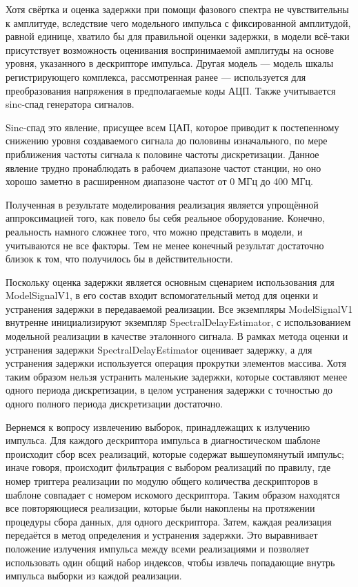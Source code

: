 \documentclass{report}
\begin{document}
Хотя свёртка и оценка задержки при помощи фазового спектра не чувствительны к амплитуде, вследствие чего  модельного импульса с фиксированной амплитудой, равной единице, хватило бы для правильной оценки задержки, в модели всё-таки присутствует возможность оценивания воспринимаемой амплитуды на основе уровня, указанного в дескрипторе импульса. Другая модель --- модель шкалы регистрирующего комплекса, рассмотренная ранее --- используется для преобразования напряжения в предполагаемые коды АЦП. Также учитывается sinc-спад генератора сигналов.

Sinc-спад это явление, присущее всем ЦАП, которое приводит к постепенному снижению уровня создаваемого сигнала до половины изначального, по мере приближения частоты сигнала к половине частоты дискретизации. Данное явление трудно пронаблюдать в рабочем диапазоне частот станции, но оно хорошо заметно в расширенном диапазоне частот от 0 МГц до 400 МГц.

Полученная в результате моделирования реализация является упрощённой аппроксимацией того, как повело бы себя реальное оборудование. Конечно, реальность намного сложнее того, что можно представить в модели, и учитываются не все факторы. Тем не менее конечный результат достаточно близок к том, что получилось бы в действительности.

Поскольку оценка задержки является основным сценарием использования для ModelSignalV1, в его состав входит вспомогательный метод для оценки и устранения задержки в передаваемой реализации. Все экземпляры ModelSignalV1 внутренне инициализируют экземпляр SpectralDelayEstimator, с использованием модельной реализации в качестве эталонного сигнала. В рамках метода оценки и устранения задержки SpectralDelayEstimator оценивает задержку, а для устранения задержки используется операция прокрутки элементов массива. Хотя таким образом нельзя устранить маленькие задержки, которые составляют менее одного периода дискретизации, в целом устранения задержки с точностью до одного полного периода дискретизации достаточно.

Вернемся к вопросу извлечению выборок, принадлежащих к излучению импульса. Для каждого дескриптора импульса в диагностическом шаблоне происходит сбор всех реализаций, которые содержат вышеупомянутый импульс; иначе говоря, происходит фильтрация с выбором реализаций по правилу, где номер триггера реализации по модулю общего количества дескрипторов в шаблоне совпадает с номером искомого дескриптора. Таким образом находятся все повторяющиеся реализации, которые были накоплены на протяжении процедуры сбора данных, для одного дескриптора. Затем, каждая реализация передаётся в метод определения и устранения задержки. Это выравнивает положение излучения импульса между всеми реализациями и позволяет использовать один общий набор индексов, чтобы извлечь попадающие внутрь импульса выборки из каждой реализации.
\end{document}
